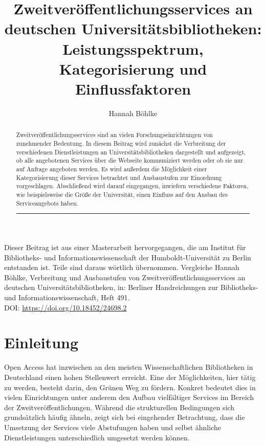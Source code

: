 \documentclass[a4paper,
fontsize=11pt,
oneside,
numbers=noperiodatend,
parskip=half-,
bibliography=totoc,
final
]{scrartcl}
\title{\LARGE{Zweitveröffentlichungsservices an deutschen Universitätsbibliotheken: Leistungsspektrum, Kategorisierung und Einflussfaktoren}}%
\author{Hannah Böhlke} %
\date{}
\begin{document}
\maketitle
\thispagestyle{fancyplain} 


\begin{abstract}
\noindent
Zweitveröffentlichungsservices sind an vielen Forschungseinrichtungen
von zunehmender Bedeutung. In diesem Beitrag wird zunächst die
Verbreitung der verschiedenen Dienstleistungen an
Universitätsbibliotheken dargestellt und aufgezeigt, ob alle angebotenen
Services über die Webseite kommuniziert werden oder ob sie nur auf
Anfrage angeboten werden. Es wird außerdem die Möglichkeit einer
Kategorisierung dieser Services betrachtet und Ausbaustufen zur
Einordnung vorgeschlagen. Abschließend wird darauf eingegangen,
inwiefern verschiedene Faktoren, wie beispielsweise die Größe der
Universität, einen Einfluss auf den Ausbau des Serviceangebots haben.
\begin{center}\rule{0.5\linewidth}{0.5pt}\end{center}
\end{abstract}

Dieser Beitrag ist aus einer Masterarbeit hervorgegangen, die am
Institut für Bibliotheks- und Informationswissenschaft der
Humboldt-Universität zu Berlin entstanden ist. Teile sind daraus
wörtlich übernommen. Vergleiche Hannah Böhlke, Verbreitung und
Ausbaustufen von Zweitveröffentlichungsservices an deutschen
Universitätsbibliotheken, in: Berliner Handreichungen zur Bibliotheks-
und Informationswissenschaft, Heft 491.\\
DOI: \url{https://doi.org/10.18452/24698.2}

\hypertarget{einleitung}{%
\section{Einleitung}\label{einleitung}}

Open Access hat inzwischen an den meisten Wissenschaftlichen
Bibliotheken in Deutschland einen hohen Stellenwert erreicht. Eine der
Möglichkeiten, hier tätig zu werden, besteht darin, den Grünen Weg zu
fördern. Konkret bedeutet dies in vielen Einrichtungen unter anderem den
Aufbau vielfältiger Services im Bereich der Zweitveröffentlichungen.
Während die strukturellen Bedingungen sich grundsätzlich häufig ähneln,
zeigt sich bei eingehender Betrachtung, dass die Umsetzung der Services
viele Abstufungen haben und selbst ähnliche Dienstleistungen
unterschiedlich umgesetzt werden können.
\end{document}
